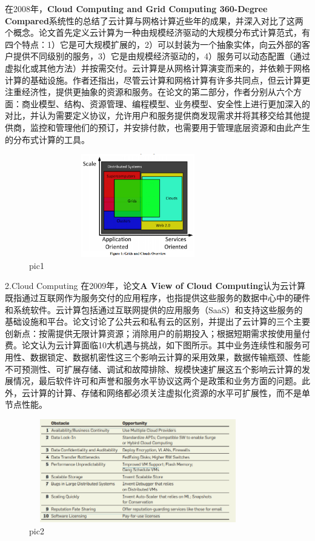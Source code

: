 \documentclass[a4paper,twoside]{scrbook}
\begin{document}
在2008年，\textbf{Cloud Computing and Grid Computing 360-Degree Compared}系统性的总结了云计算与网格计算近些年的成果，并深入对比了这两个概念。论文首先定义云计算为一种由规模经济驱动的大规模分布式计算范式，有四个特点：1）它是可大规模扩展的，2）可以封装为一个抽象实体，向云外部的客户提供不同级别的服务，3）它是由规模经济驱动的，4）服务可以动态配置（通过虚拟化或其他方法）并按需交付。云计算是从网格计算演变而来的，并依赖于网格计算的基础设施。作者还指出，尽管云计算和网格计算有许多共同点，但云计算更注重经济性，提供更抽象的资源和服务。在论文的第二部分，作者分别从六个方面：商业模型、结构、资源管理、编程模型、业务模型、安全性上进行更加深入的对比，并认为需要定义协议，允许用户和服务提供商发现需求并将其移交给其他提供商，监控和管理他们的预订，并安排付款，也需要用于管理底层资源和由此产生的分布式计算的工具。
\begin{figure}
\centering %
\includegraphics[height=4.5cm,width=9.5cm]{compared.png}
\caption{pic1}
\end{figure}


2.Cloud Computing
在2009年，论文\textbf{A View of Cloud Computing}认为云计算既指通过互联网作为服务交付的应用程序，也指提供这些服务的数据中心中的硬件和系统软件。云计算包括通过互联网提供的应用服务（SaaS）和支持这些服务的基础设施和平台。论文讨论了公共云和私有云的区别，并提出了云计算的三个主要创新点：按需提供无限计算资源；消除用户的前期投入；根据短期需求按使用量付费。论文认为云计算面临10大机遇与挑战，如下图所示。其中业务连续性和服务可用性、数据锁定、数据机密性这三个影响云计算的采用效果，数据传输瓶颈、性能不可预测性、可扩展存储、调试和故障排除、规模快速扩展这五个影响云计算的发展情况，最后软件许可和声誉和服务水平协议这两个是政策和业务方面的问题。此外，云计算的计算、存储和网络都必须关注虚拟化资源的水平可扩展性，而不是单节点性能。
\begin{figure}
\centering %
\includegraphics[height=4.5cm,width=9.5cm]{cloud10.png}
\caption{pic2}
\end{figure}
\end{document}
